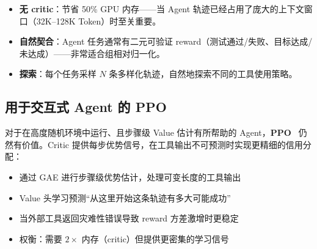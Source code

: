 \begin{intuitionbox}
\begin{itemize}
  \item \textbf{无 critic}：节省 50\% GPU 内存——当 Agent 轨迹已经占用了庞大的上下文窗口（32K--128K Token）时至关重要。
  \item \textbf{自然契合}：Agent 任务通常有二元可验证 reward（测试通过/失败、目标达成/未达成）——非常适合组相对归一化。
  \item \textbf{探索}：每个任务采样 $N$ 条多样化轨迹，自然地探索不同的工具使用策略。
\end{itemize}
\end{intuitionbox}

\subsection{用于交互式 Agent 的 PPO}
\label{ppo-for-interactive-agents}

对于在高度随机环境中运行、且步骤级 Value 估计有所帮助的 Agent，\textbf{PPO}~\cite{schulman2017proximal} 仍然有价值。Critic 提供每步优势信号，在工具输出不可预测时实现更精细的信用分配：

\begin{itemize}
  \item 通过 GAE 进行步骤级优势估计，处理可变长度的工具输出
  \item Value 头学习预测``从这里开始这条轨迹有多大可能成功''
  \item 当外部工具返回灾难性错误导致 reward 方差激增时更稳定
  \item 权衡：需要 $2\times$ 内存（critic）但提供更密集的学习信号
\end{itemize}

